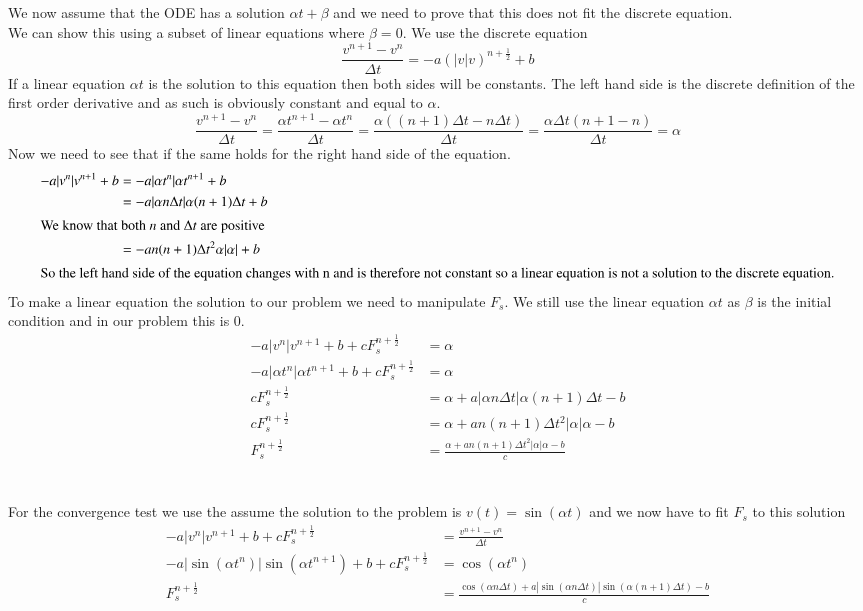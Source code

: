 \documentclass[12pt, norsk, a4paper]{article}
\begin{document}
\section{}
We now assume that the ODE has a solution $\alpha t + \beta$ and we need to
prove that this does not fit the discrete equation. \\
We can show this using a subset of linear equations where $\beta=0$.
We use the discrete equation 
\[\frac{v^{n+1}-v^n}{\Delta t} = -a (|v|v)^{n+\frac{1}{2}} + b \]
If a linear equation $\alpha t$ is the solution to this equation then both
sides will be constants. The left hand side is the discrete definition of the
first order derivative and as such is obviously constant and equal to $\alpha$.
\[\frac{v^{n+1}-v^n}{\Delta t} = \frac{\alpha t^{n+1}-\alpha t^n}{\Delta t} =
\frac{\alpha((n+1)\Delta t - n \Delta t)}{\Delta t} = \frac{\alpha \Delta t
    (n+1-n)}{\Delta t} = \alpha \]
Now we need to see that if the same holds for the right hand side of the
equation.
\begin{align*}
-a |v^n|v^{n+1} + b &= -a |\alpha t^n|\alpha t^{n+1} + b \\
        &= -a |\alpha n \Delta t|\alpha (n+1) \Delta t + b \\
\intertext{We know that both $n$ and $\Delta t$ are positive}
&= -a n(n+1) \Delta t^2 \alpha |\alpha| + b \\
\intertext{So the left hand side of the equation changes with n and is
    therefore not constant so a linear equation is not a solution to the
        discrete equation.}
\end{align*}
To make a linear equation the solution to our problem we need to manipulate
$F_s$. We still use the linear equation $\alpha t$ as $\beta$ is the initial
condition and in our problem this is 0. 
\begin{align*}
-a |v^n|v^{n+1} + b + cF_s^{n+\frac{1}{2}} & = \alpha \\
-a |\alpha t^n|\alpha t^{n+1} + b + cF_s^{n+\frac{1}{2}} &= \alpha \\
cF_s^{n+\frac{1}{2}} &= \alpha + a |\alpha n \Delta t|\alpha (n+1) \Delta t - b
\\
cF_s^{n+\frac{1}{2}} &= \alpha + a n(n+1)\Delta t^2 |\alpha| \alpha -b \\
F_s^{n+\frac{1}{2}} &= \frac{\alpha + a n(n+1)\Delta t^2 |\alpha| \alpha -b }{c}
\end{align*}
\section{}
For the convergence test we use the assume the solution to the problem is
$v(t)= \sin(\alpha t)$ and we now have to fit $F_s$ to this solution
\begin{align*}
-a |v^n|v^{n+1} + b + cF_s^{n+\frac{1}{2}} &= \frac{v^{n+1}-v^n}{\Delta t} \\
-a |\sin(\alpha t^n)| \sin(\alpha t^{n+1}) + b + cF_s^{n+\frac{1}{2}} &=
\cos(\alpha t^n) \\
F_s^{n+\frac{1}{2}} &= \frac{\cos(\alpha n \Delta t) + a |\sin(\alpha n \Delta
        t)| \sin (\alpha (n+1) \Delta t) - b}{c}
\end{align*}
\end{document}
